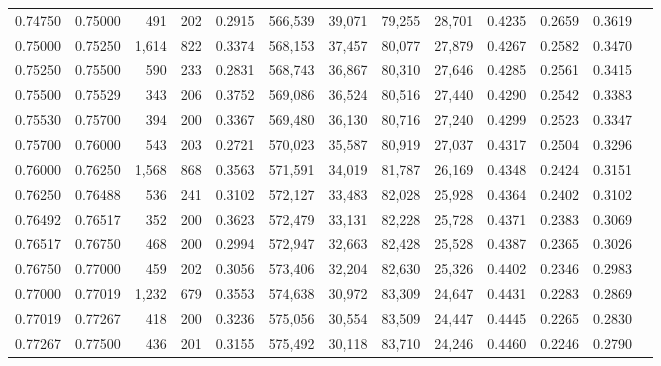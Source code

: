 \begin{tabular}{rrrrrrrrrrrrr}
0.74750 & 0.75000 &   491 & 202 &                                     0.2915 & 566,539 &  39,071 &  79,255 &  28,701 & 0.4235 & 0.2659 & 0.3619 \\
0.75000 & 0.75250 & 1,614 & 822 &                                     0.3374 & 568,153 &  37,457 &  80,077 &  27,879 & 0.4267 & 0.2582 & 0.3470 \\
0.75250 & 0.75500 &   590 & 233 &                                     0.2831 & 568,743 &  36,867 &  80,310 &  27,646 & 0.4285 & 0.2561 & 0.3415 \\
0.75500 & 0.75529 &   343 & 206 &                                     0.3752 & 569,086 &  36,524 &  80,516 &  27,440 & 0.4290 & 0.2542 & 0.3383 \\
0.75530 & 0.75700 &   394 & 200 &                                     0.3367 & 569,480 &  36,130 &  80,716 &  27,240 & 0.4299 & 0.2523 & 0.3347 \\
0.75700 & 0.76000 &   543 & 203 &                                     0.2721 & 570,023 &  35,587 &  80,919 &  27,037 & 0.4317 & 0.2504 & 0.3296 \\
0.76000 & 0.76250 & 1,568 & 868 &                                     0.3563 & 571,591 &  34,019 &  81,787 &  26,169 & 0.4348 & 0.2424 & 0.3151 \\
0.76250 & 0.76488 &   536 & 241 &                                     0.3102 & 572,127 &  33,483 &  82,028 &  25,928 & 0.4364 & 0.2402 & 0.3102 \\
0.76492 & 0.76517 &   352 & 200 &                                     0.3623 & 572,479 &  33,131 &  82,228 &  25,728 & 0.4371 & 0.2383 & 0.3069 \\
0.76517 & 0.76750 &   468 & 200 &                                     0.2994 & 572,947 &  32,663 &  82,428 &  25,528 & 0.4387 & 0.2365 & 0.3026 \\
0.76750 & 0.77000 &   459 & 202 &                                     0.3056 & 573,406 &  32,204 &  82,630 &  25,326 & 0.4402 & 0.2346 & 0.2983 \\
0.77000 & 0.77019 & 1,232 & 679 &                                     0.3553 & 574,638 &  30,972 &  83,309 &  24,647 & 0.4431 & 0.2283 & 0.2869 \\
0.77019 & 0.77267 &   418 & 200 &                                     0.3236 & 575,056 &  30,554 &  83,509 &  24,447 & 0.4445 & 0.2265 & 0.2830 \\
0.77267 & 0.77500 &   436 & 201 &                                     0.3155 & 575,492 &  30,118 &  83,710 &  24,246 & 0.4460 & 0.2246 & 0.2790 \\

\end{tabular}
